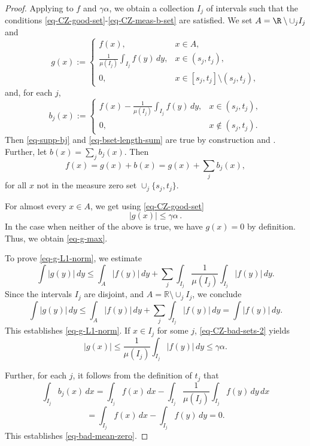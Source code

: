 \begin{proof}
    Applying  to $f$ and $\gamma\alpha$, we obtain a collection $I_j$ of intervals such that the conditions \eqref{eq-CZ-good-set}-\eqref{eq-CZ-meas-b-set} are satisfied. We set $A = \R \setminus \cup_j I_j$ and
\begin{equation}
    \label{eq-g-def}
    g(x):=\begin{cases}
     f(x), & x\in A,\\
     \frac{1}{\mu(I_j)}\int_{I_j} f(y)\, dy, &x\in (s_j, t_j),\\
     0, & x\in [s_j, t_j]\setminus (s_j, t_j),
    \end{cases}
\end{equation}
and, for each $j$,
\begin{equation}
    b_j(x):=\begin{cases}
        f(x)-\frac{1}{\mu(I_j)}\int_{I_j} f(y)\, dy, &x\in (s_j, t_j),\\
        0, & x\not\in (s_j, t_j).
    \end{cases}
\end{equation}
Then \eqref{eq-supp-bj} and \eqref{eq-bset-length-sum} are true by construction and .
Further, let $b(x)=\sum_{j} b_j(x).$
Then
\begin{equation*}
    f(x)=g(x)+b(x)=g(x)+\sum_{j} b_j(x) ,
\end{equation*}
for all $x$ not in the measure zero set $\cup_j \{s_j, t_j\}.$

For almost every $x\in A$, we get using \eqref{eq-CZ-good-set}
$$|g(x)|\leq \gamma\alpha\,.$$ In the case when neither of the above is true, we have $g(x)=0$ by definition.
Thus, we obtain \eqref{eq-g-max}.

To prove \eqref{eq-g-L1-norm}, we estimate
$$\int |g(y)|\, dy\leq \int_A |f(y)|\, dy+ \sum_{j} \int_{I_j}\frac{1}{\mu(I_j)}\int_{I_j}|f(y)|\, dy.$$
Since the intervals $I_j$ are disjoint, and $A=\mathbb{R}\setminus \cup_j I_j$, we conclude
$$\int |g(y)|\, dy\leq \int_A |f(y)|\, dy+\sum_{j} \int_{I_j}|f(y)|\, dy= \int |f(y)|\, dy.$$
This establishes \eqref{eq-g-L1-norm}.
If $x\in I_j$ for some $j$, \eqref{eq-CZ-bad-sets-2} yields
$$|g(x)|\leq \frac{1}{\mu(I_j)}\int_{I_j}|f(y)|\, dy\leq \gamma\alpha.$$


Further, for each $j$, it follows from the definition of $t_j$ that
$$ \int_{I_j} b_j(x)\, dx= \int_{I_j} f(x)\, dx-\int_{I_j} \frac{1}{\mu(I_j)}\int_{I_j}f(y)\, dy\, dx$$
\begin{equation*}
    =\int_{I_j} f(x)\, dx- \int_{I_j}f(y)\, dy=0.
\end{equation*}
This establishes \eqref{eq-bad-mean-zero}.


\end{proof}
